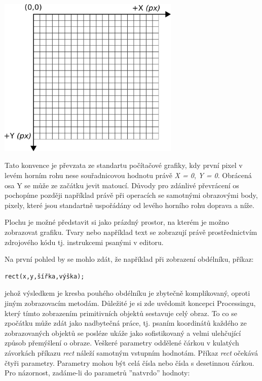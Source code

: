 \documentclass[11pt]{book}
\begin{document}
\begin{center}
\includegraphics[width = 0.65\textwidth]{imgs/grid2d.png}
\end{center}

Tato konvence je převzata ze standartu počítačové grafiky, kdy první pixel v levém horním rohu nese souřadnicovou hodnotu právě {\em X = 0}, {\em Y = 0}. Obrácená osa Y se může ze začátku jevit matoucí. Důvody pro zdánlivé převrácení os pochopíme později například právě při operacích se samotnými obrazovými body, pixely, které jsou standartně uspořádány od levého horního rohu doprava a níže.

Plochu je možné představit si jako prázdný prostor, na kterém je možno zobrazovat grafiku. Tvary nebo například text se zobrazují právě prostřednictvím zdrojového kódu tj. instrukcemi psanými v editoru.

Na první pohled by se mohlo zdát, že například při zobrazení obdélníku, příkaz:

\begin{lstlisting}
rect(x,y,šířka,výška);
\end{lstlisting}

jehož výsledkem je kresba pouhého obdélníku je zbytečně komplikovaný, oproti jiným zobrazovacím metodám. Důležité je si zde uvědomit koncepci Processingu, který tímto zobrazením primitivních objektů sestavuje celý obraz. To co se zpočátku může zdát jako nadbytečná práce, tj. psaním koordinátů každého ze zobrazovaných objektů se posléze ukáže jako sofistikovaný a velmi ulehčující způsob přemýšlení o obraze. Veškeré parametry oddělené čárkou v kulatých závorkách příkazu {\em rect} náleží samotným vstupním hodnotám. Příkaz {\em rect} očekává čtyři parametry. Parametry mohou být celá čísla nebo čísla s desetinnou čárkou. Pro názornost, zadáme-li do parametrů ''natvrdo'' hodnoty:
\end{document}
